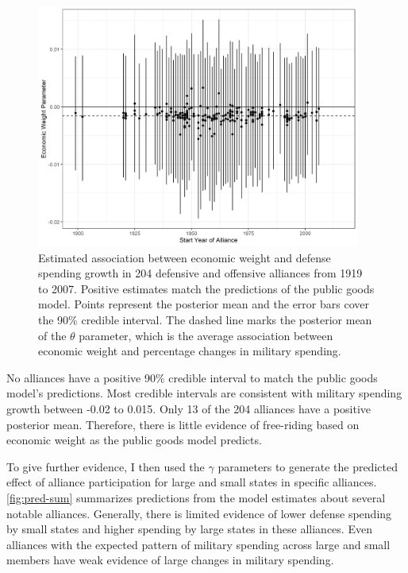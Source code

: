 \documentclass[12pt]{article}
\begin{document}
\begin{figure}[htbp]
	\centering
		\includegraphics[width=0.95\textwidth]{alliance-coefs-year.png}
	\caption{Estimated association between economic weight and defense spending growth in 204 defensive and offensive alliances from 1919 to 2007. Positive estimates match the predictions of the public goods model. Points represent the posterior mean and the error bars cover the 90\% credible interval. The dashed line marks the posterior mean of the $\theta$ parameter, which is the average association between economic weight and percentage changes in military spending.}
	\label{fig:alliance-coefs-year}
\end{figure}


No alliances have a positive 90\% credible interval to match the public goods model's predictions. 
Most credible intervals are consistent with military spending growth between -0.02 to 0.015. 
Only 13 of the 204 alliances have a positive posterior mean. 
Therefore, there is little evidence of free-riding based on economic weight as the public goods model predicts. 


To give further evidence, I then used the $\gamma$ parameters to generate the predicted effect of alliance participation for large and small states in specific alliances.
\autoref{fig:pred-sum} summarizes predictions from the model estimates about several notable alliances. 
Generally, there is limited evidence of lower defense spending by small states and higher spending by large states in these alliances. 
Even alliances with the expected pattern of military spending across large and small members have weak evidence of large changes in military spending.  
\end{document}
